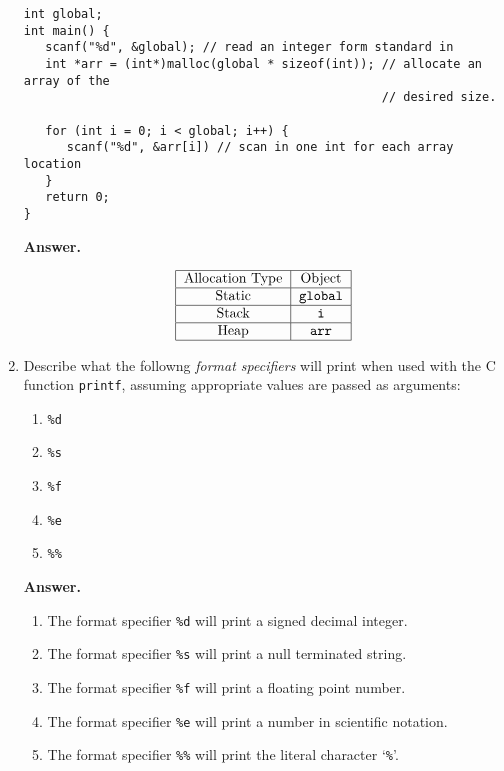 \documentclass[9pt]{article}
\begin{document}
\begin{enumerate}
         \begin{verbatim}
int global;
int main() {
   scanf("%d", &global); // read an integer form standard in
   int *arr = (int*)malloc(global * sizeof(int)); // allocate an array of the
                                                  // desired size.

   for (int i = 0; i < global; i++) {
      scanf("%d", &arr[i]) // scan in one int for each array location
   }
   return 0;
}
         \end{verbatim}

      \textbf{Answer.}

      $$
         \begin{tabular}{@{}|c|c|@{}} \hline
            Allocation Type & Object \\ \hline
            Static & \verb|global| \\ \hline
            Stack  & \verb|i| \\ \hline
            Heap   & \verb|arr| \\ \hline
         \end{tabular}
      $$
   \item Describe what the followng \textit{format specifiers} will print when
         used with the C function \verb|printf|, assuming appropriate values are
         passed as arguments:
         \begin{enumerate}
            \item \verb|%d|
            \item \verb|%s|
            \item \verb|%f|
            \item \verb|%e|
            \item \verb|%%|
         \end{enumerate}

      \textbf{Answer.}

      \begin{enumerate}
         \item The format specifier \verb|%d| will print a signed decimal
               integer.
         \item The format specifier \verb|%s| will print a null terminated
               string.
         \item The format specifier \verb|%f| will print a floating point
               number.
         \item The format specifier \verb|%e| will print a number in scientific
               notation.
         \item The format specifier \verb|%%| will print the literal character
               `\verb|%|'.
      \end{enumerate}
\end{enumerate}
\end{document}
